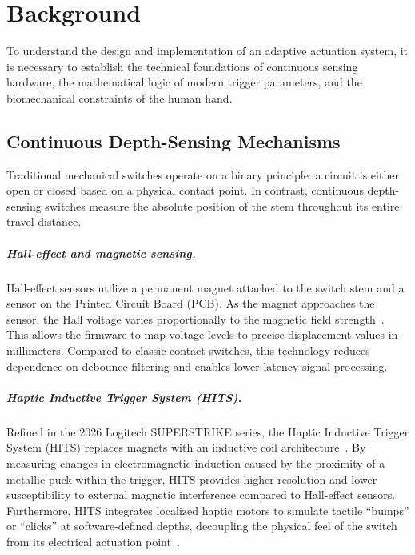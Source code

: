 \chapter{Background}
\label{chap:background}

To understand the design and implementation of an adaptive actuation system, it is necessary to establish the technical foundations of continuous sensing hardware, the mathematical logic of modern trigger parameters, and the biomechanical constraints of the human hand.

\section{Continuous Depth-Sensing Mechanisms}

Traditional mechanical switches operate on a binary principle: a circuit is either open or closed based on a physical contact point. In contrast, continuous depth-sensing switches measure the absolute position of the stem throughout its entire travel distance.

\paragraph{Hall-effect and magnetic sensing.}
Hall-effect sensors utilize a permanent magnet attached to the switch stem and a sensor on the Printed Circuit Board (PCB). As the magnet approaches the sensor, the Hall voltage varies proportionally to the magnetic field strength~\cite{wooting_rapid_trigger, pcgamer_hall_effect, ti_hall_effect_keyboard_2025}. This allows the firmware to map voltage levels to precise displacement values in millimeters. Compared to classic contact switches, this technology reduces dependence on debounce filtering and enables lower-latency signal processing.

\paragraph{Haptic Inductive Trigger System (HITS).}
Refined in the 2026 Logitech SUPERSTRIKE series, the Haptic Inductive Trigger System (HITS) replaces magnets with an inductive coil architecture~\cite{logitech_hits_patent, techradar_superstrike_2026, logitech_hits_official}. By measuring changes in electromagnetic induction caused by the proximity of a metallic puck within the trigger, HITS provides higher resolution and lower susceptibility to external magnetic interference compared to Hall-effect sensors. Furthermore, HITS integrates localized haptic motors to simulate tactile \enquote{bumps} or \enquote{clicks} at software-defined depths, decoupling the physical feel of the switch from its electrical actuation point~\cite{fox_superstrike_2026, logitech_hits_official}.


